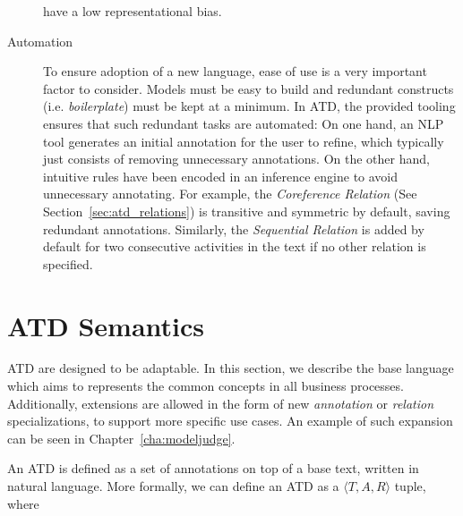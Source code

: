 \begin{description}
{    have a low representational bias.}
\item[Automation]{To ensure adoption of a new language, ease of use is a very
    important factor to consider. Models must be easy to build and redundant
    constructs (i.e. \emph{boilerplate}) must be kept at a minimum. In ATD, the
    provided tooling ensures that such redundant tasks are automated: On one
    hand, an NLP tool generates an initial annotation for the user to refine,
    which typically just consists of removing unnecessary annotations. On the
    other hand, intuitive rules have been encoded in an inference engine to
    avoid unnecessary annotating. For example, the \emph{Coreference Relation}
    (See Section~\ref{sec:atd_relations}) is transitive and symmetric by
    default, saving redundant annotations. Similarly, the \emph{Sequential
      Relation} is added by default for two consecutive activities in the text
    if no other relation is specified.}
\end{description}



  
%

\section{ATD Semantics}
\label{sec:atd_semantics}

ATD are designed to be adaptable. In this section, we describe the base language
which aims to represents the common concepts in all business processes.
Additionally, extensions are allowed in the form of new \emph{annotation} or
\emph{relation} specializations, to support more specific use cases. An example
of such expansion can be seen in Chapter~\ref{cha:modeljudge}.


An ATD is defined as a set of annotations on top of a base text, written in
natural language. More formally, we can define an ATD as a $\langle T, A, R \rangle$ tuple, where 

